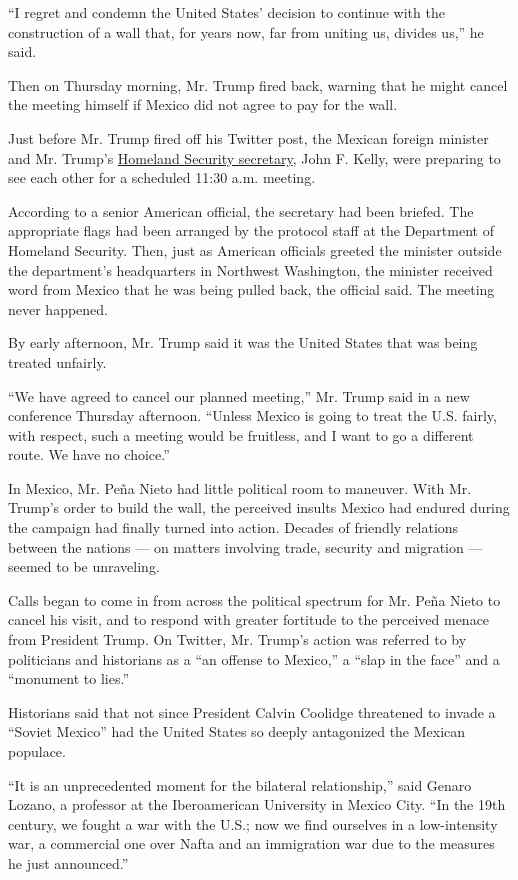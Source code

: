 ``I regret and condemn the United States' decision to continue with the
construction of a wall that, for years now, far from uniting us, divides
us,'' he said.

Then on Thursday morning, Mr. Trump fired back, warning that he might
cancel the meeting himself if Mexico did not agree to pay for the wall.

Just before Mr. Trump fired off his Twitter post, the Mexican foreign
minister and Mr. Trump's
\href{https://www.nytimes.com/2017/01/25/us/politics/homeland-security-john-kelly-border-wall.html}{Homeland
Security secretary}, John F. Kelly, were preparing to see each other for
a scheduled 11:30 a.m. meeting.

According to a senior American official, the secretary had been briefed.
The appropriate flags had been arranged by the protocol staff at the
Department of Homeland Security. Then, just as American officials
greeted the minister outside the department's headquarters in Northwest
Washington, the minister received word from Mexico that he was being
pulled back, the official said. The meeting never happened.

By early afternoon, Mr. Trump said it was the United States that was
being treated unfairly.

``We have agreed to cancel our planned meeting,'' Mr. Trump said in a
new conference Thursday afternoon. ``Unless Mexico is going to treat the
U.S. fairly, with respect, such a meeting would be fruitless, and I want
to go a different route. We have no choice.''

In Mexico, Mr. Peña Nieto had little political room to maneuver. With
Mr. Trump's order to build the wall, the perceived insults Mexico had
endured during the campaign had finally turned into action. Decades of
friendly relations between the nations --- on matters involving trade,
security and migration --- seemed to be unraveling.

Calls began to come in from across the political spectrum for Mr. Peña
Nieto to cancel his visit, and to respond with greater fortitude to the
perceived menace from President Trump. On Twitter, Mr. Trump's action
was referred to by politicians and historians as a ``an offense to
Mexico,'' a ``slap in the face'' and a ``monument to lies.''

Historians said that not since President Calvin Coolidge threatened to
invade a ``Soviet Mexico'' had the United States so deeply antagonized
the Mexican populace.

``It is an unprecedented moment for the bilateral relationship,'' said
Genaro Lozano, a professor at the Iberoamerican University in Mexico
City. ``In the 19th century, we fought a war with the U.S.; now we find
ourselves in a low-intensity war, a commercial one over Nafta and an
immigration war due to the measures he just announced.''

